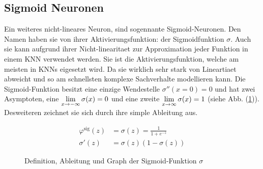 \subsection{Sigmoid Neuronen}
Ein weiteres nicht-lineares Neuron, sind sogennante Sigmoid-Neuronen.
Den Namen haben sie von ihrer Aktivierungsfunktion: der Sigmoidfunktion $\sigma$.
\para{}
Auch sie kann aufgrund ihrer Nicht-linearitaet zur Approximation jeder Funktion
in einem KNN verwendet werden. Sie ist die Aktivierungsfunktion, welche am
meisten in KNNs eigesetzt wird. Da sie wirklich sehr stark von Lineartiaet
abweicht und so am schnellsten komplexe Sachverhalte modellieren kann.
\para{}
Die Sigmoid-Funktion besitzt eine einzige Wendestelle $\sigma''(x=0)=0$ und hat
zwei Asymptoten, eine $\displaystyle\lim_{x \to -\infty} \sigma(x)=0$
und eine zweite $\displaystyle\lim_{x \to \infty} \sigma(x)=1$ (siehe Abb.
(\ref{fig:sigmoid})). Desweiteren zeichnet sie sich durch ihre simple Ableitung aus.
\\
\begin{figure}[h!]
  \begin{minipage}[h!]{0.5\textwidth}
    \begin{align*}
      \varphi^{\text{sig}}(z) &= \sigma(z) = \frac{1}{1 + e^{-z}}\\
      \sigma'(z)&=\sigma(z)(1-\sigma(z))
    \end{align*}
  \end{minipage}
  \begin{minipage}[h!]{0.5\textwidth}
    \centering
  \end{minipage}
  \caption{Definition, Ableitung und Graph der Sigmoid-Funktion $\sigma$}
  \label{fig:sigmoid}
\end{figure}

